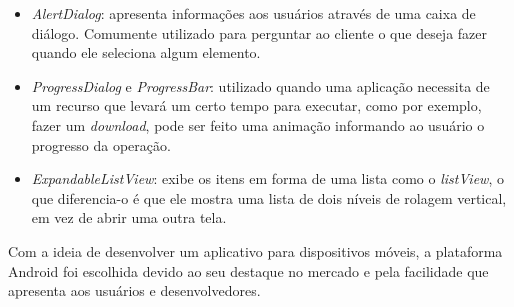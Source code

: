 \begin{itemize}
		  \item \textit{AlertDialog}: apresenta informações aos usuários através de
		  uma caixa de diálogo. Comumente utilizado para perguntar ao cliente o que
		  deseja fazer quando ele seleciona algum elemento.
		
		  \item \textit{ProgressDialog} e \textit{ProgressBar}: utilizado quando uma
		  aplicação necessita de um recurso que levará um certo tempo para executar,
		  como por exemplo, fazer um \textit{download}, pode ser feito uma animação
		  informando ao usuário o progresso da operação.
		  
		  \item \textit{ExpandableListView}: exibe os itens em forma de uma lista
		  como o \textit{listView}, o que diferencia-o é que ele mostra uma lista de
		  dois níveis de rolagem vertical, em vez de abrir uma outra tela.

	\end{itemize}

\par Com a ideia de desenvolver um aplicativo para dispositivos móveis, a
plataforma Android foi escolhida devido ao seu destaque no mercado e pela
facilidade que apresenta aos usuários e desenvolvedores.